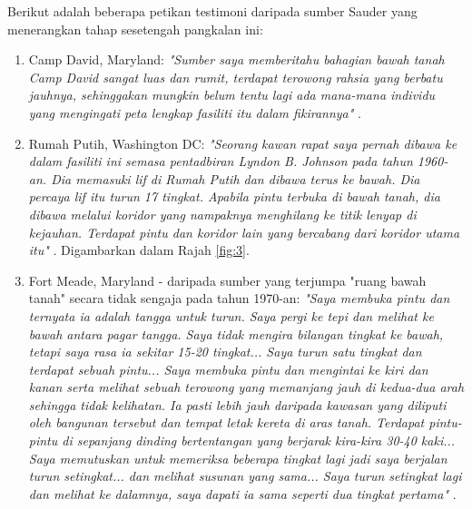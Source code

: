 \documentclass[10pt,twocolumn,letterpaper]{article}
\begin{document}
Berikut adalah beberapa petikan testimoni daripada sumber Sauder yang menerangkan tahap sesetengah pangkalan ini:
\begin{flushleft}
\begin{enumerate}
    \item Camp David, Maryland: \textit{"Sumber saya memberitahu bahagian bawah tanah Camp David sangat luas dan rumit, terdapat terowong rahsia yang berbatu jauhnya, sehinggakan mungkin belum tentu lagi ada mana-mana individu yang mengingati peta lengkap fasiliti itu dalam fikirannya"} \cite{22}.
    \item Rumah Putih, Washington DC: \textit{"Seorang kawan rapat saya pernah dibawa ke dalam fasiliti ini semasa pentadbiran Lyndon B. Johnson pada tahun 1960-an. Dia memasuki lif di Rumah Putih dan dibawa terus ke bawah. Dia percaya lif itu turun 17 tingkat. Apabila pintu terbuka di bawah tanah, dia dibawa melalui koridor yang nampaknya menghilang ke titik lenyap di kejauhan. Terdapat pintu dan koridor lain yang bercabang dari koridor utama itu"} \cite{22}. Digambarkan dalam Rajah \ref{fig:3}.
    \item Fort Meade, Maryland - daripada sumber yang terjumpa "ruang bawah tanah" secara tidak sengaja pada tahun 1970-an: \textit{"Saya membuka pintu dan ternyata ia adalah tangga untuk turun. Saya pergi ke tepi dan melihat ke bawah antara pagar tangga. Saya tidak mengira bilangan tingkat ke bawah, tetapi saya rasa ia sekitar 15-20 tingkat... Saya turun satu tingkat dan terdapat sebuah pintu... Saya membuka pintu dan mengintai ke kiri dan kanan serta melihat sebuah terowong yang memanjang jauh di kedua-dua arah sehingga tidak kelihatan. Ia pasti lebih jauh daripada kawasan yang diliputi oleh bangunan tersebut dan tempat letak kereta di aras tanah. Terdapat pintu-pintu di sepanjang dinding bertentangan yang berjarak kira-kira 30-40 kaki... Saya memutuskan untuk memeriksa beberapa tingkat lagi jadi saya berjalan turun setingkat... dan melihat susunan yang sama... Saya turun setingkat lagi dan melihat ke dalamnya, saya dapati ia sama seperti dua tingkat pertama"} \cite{22}.
\end{enumerate}
\end{flushleft}
\end{document}
